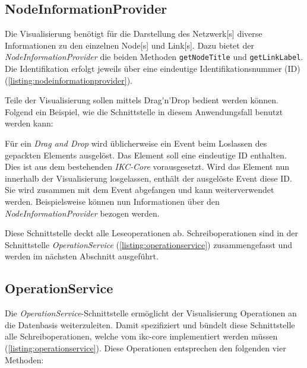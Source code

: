 \subsection{NodeInformationProvider}
\label{NodeInformationProvider}

Die Visualisierung benötigt für die Darstellung des \gls{Netzwerk}[s] diverse Informationen zu den einzelnen \gls{Node}[s] und \gls{Link}[s]. Dazu bietet der \textit{NodeInformationProvider} die beiden Methoden \texttt{getNodeTitle} und \texttt{getLinkLabel}. Die Identifikation erfolgt jeweils über eine eindeutige Identifikationsnummer (ID) (\autoref{listing:nodeinformationprovider}).

Teile der Visualisierung sollen mittels \gls{Drag'n'Drop} bedient werden können. Folgend ein Beispiel, wie die Schnittstelle in diesem Anwendungsfall benutzt werden kann:

Für ein \textit{Drag and Drop} wird üblicherweise ein \gls{Event} beim Loslassen des gepackten Elements ausgelöst. Das Element soll eine eindeutige ID enthalten. Dies ist aus dem bestehenden \textit{IKC-Core} vorausgesetzt. Wird das Element nun innerhalb der Visualisierung losgelassen, enthält der ausgelöste \gls{Event} diese ID. Sie wird zusammen mit dem \gls{Event} abgefangen und kann weiterverwendet werden. Beispielsweise können nun Informationen über den \textit{NodeInformationProvider} bezogen werden.


Diese Schnittstelle deckt alle Leseoperationen ab. Schreiboperationen sind in der Schnittstelle \textit{OperationService} (\autoref{listing:operationservice}) zusammengefasst und werden im nächsten Abschnitt ausgeführt. 

\subsection{OperationService}
\label{OperationService}

Die \textit{OperationService}-Schnittstelle ermöglicht der Visualisierung Operationen an die Datenbasis weiterzuleiten. Damit spezifiziert und bün\-delt diese Schnittstelle alle Schreiboperationen, welche vom \gls{ikc-core} implementiert werden müssen (\autoref{listing:operationservice}). Diese Operationen entsprechen den folgenden vier Methoden:

